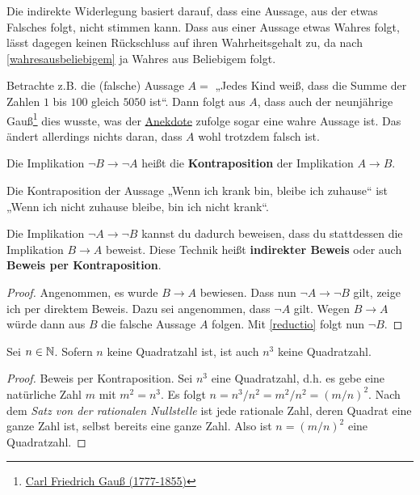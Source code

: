 \begin{bem}[*]
    Die indirekte Widerlegung basiert darauf, dass eine Aussage, aus der etwas Falsches folgt, nicht stimmen kann. Dass aus einer Aussage etwas Wahres folgt, lässt dagegen keinen Rückschluss auf ihren Wahrheitsgehalt zu, da nach \cref{wahresausbeliebigem} ja Wahres aus Beliebigem folgt.
    
    Betrachte z.B. die (falsche) Aussage $A=$ „Jedes Kind weiß, dass die Summe der Zahlen $1$ bis $100$ gleich $5050$ ist“. Dann folgt aus $A$, dass auch der neunjährige Gauß\footnote{\href{https://de.wikipedia.org/wiki/Carl_Friedrich_Gau\%C3\%9F}{Carl Friedrich Gauß (1777-1855)}} dies wusste, was der \href{https://de.wikipedia.org/wiki/Gau\%C3\%9Fsche_Summenformel#Geschichte_der_Bezeichnung}{Anekdote} zufolge sogar eine wahre Aussage ist. Das ändert allerdings nichts daran, dass $A$ wohl trotzdem falsch ist.
\end{bem}


\begin{defin} 
 Die Implikation $\neg B \to \neg A$ heißt die \textbf{Kontraposition} der Implikation $A\to B$. 
\end{defin}


\begin{bsp}
    Die Kontraposition der Aussage „Wenn ich krank bin, bleibe ich zuhause“ ist „Wenn ich nicht zuhause bleibe, bin ich nicht krank“.
\end{bsp}


\begin{satz} \label{indirekterbeweis} 
    Die Implikation $\neg A\to \neg B$ kannst du dadurch beweisen, dass du stattdessen die Implikation $B\to A$ beweist. Diese Technik heißt \textbf{indirekter Beweis} oder auch \textbf{Beweis per Kontraposition}.
\end{satz}
\begin{proof}
    Angenommen, es wurde $B\to A$ bewiesen. Dass nun $\neg A\to \neg B$ gilt, zeige ich per direktem Beweis. Dazu sei angenommen, dass $\neg A$ gilt. Wegen $B\to A$ würde dann aus $B$ die falsche Aussage $A$ folgen. Mit \cref{reductio} folgt nun $\neg B$.
\end{proof}


\begin{bsp}
    Sei $n\in\mathbb N$. Sofern $n$ keine Quadratzahl ist, ist auch $n^3$ keine Quadratzahl.
\end{bsp}
\begin{proof}
    Beweis per Kontraposition. Sei $n^3$ eine Quadratzahl, d.h. es gebe eine natürliche Zahl $m$ mit $m^2=n^3$. Es folgt $n=n^3/n^2=m^2/n^2 = (m/n)^2$. Nach dem \emph{Satz von der rationalen Nullstelle} ist jede rationale Zahl, deren Quadrat eine ganze Zahl ist, selbst bereits eine ganze Zahl. Also ist $n=(m/n)^2$ eine Quadratzahl.
\end{proof}
  
